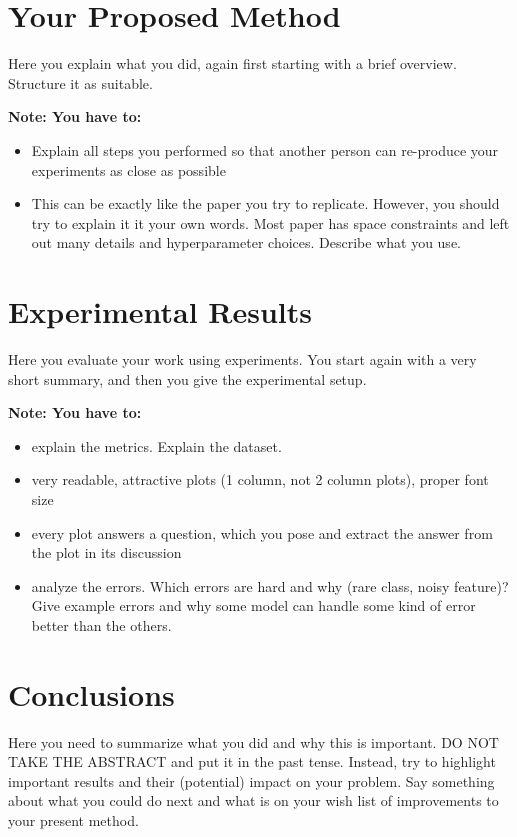 \documentclass{article}
\begin{document}
\section{Your Proposed Method}\label{sec:yourmethod}

Here you explain what you did, again first starting with a brief overview.
Structure it as suitable. 

{\bf Note: You have to:}
\begin{itemize}
\item Explain all steps you performed so that another person can re-produce your experiments as close as possible
\item This can be exactly like the paper you try to replicate. However, you should try to explain it it your own words. Most paper has space constraints and left out many details and hyperparameter choices. Describe what you use.
\end{itemize}


\section{Experimental Results}
\label{sec:exp}

Here you evaluate your work using experiments.  You start again with a very short summary, and then you
give the experimental setup. 

{\bf Note: You have to:}
\begin{itemize}
\item explain the metrics. Explain the dataset.
\item very readable, attractive plots (1 column, not 2 column plots),
proper font size
\item every plot answers a question, which you pose and extract the
answer from the plot in its discussion
\item analyze the errors. Which errors are hard and why (rare class, noisy feature)? Give example errors and why some model can handle some kind of error better than the others.
\end{itemize}

\section{Conclusions}
\label{sec:conclusion}

Here you need to summarize what you did and why this is important.  DO
NOT TAKE THE ABSTRACT and put it in the past tense. Instead, try to
highlight important results and their (potential) impact on your
problem. Say something about what you could do next and what is on
your wish list of improvements to your present method.
\end{document}
